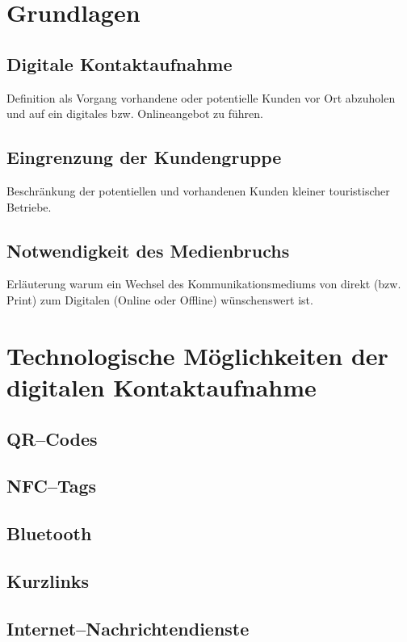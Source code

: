 \section{Grundlagen}
\label{sec:grundlagen}

\subsection{Digitale Kontaktaufnahme}

Definition als Vorgang vorhandene oder potentielle
Kunden vor Ort abzuholen und auf ein digitales bzw. Onlineangebot zu
führen.

\subsection{Eingrenzung der Kundengruppe}

Beschränkung der potentiellen und vorhandenen Kunden kleiner touristischer Betriebe.

\subsection{Notwendigkeit des Medienbruchs}

Erläuterung warum ein Wechsel des Kommunikationsmediums von direkt (bzw. Print) zum Digitalen (Online oder Offline) wünschenswert ist.

\section{Technologische Möglichkeiten der digitalen Kontaktaufnahme}
\label{sec:technologien}

\subsection{QR–Codes}
\subsection{NFC--Tags}
\subsection{Bluetooth}
\subsection{Kurzlinks}
\subsection{Internet--Nachrichtendienste}

